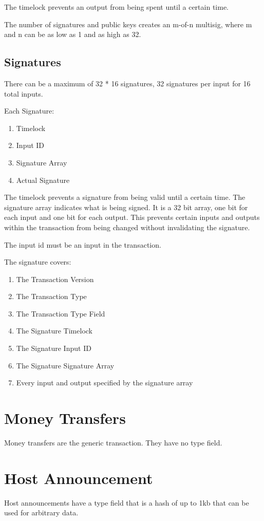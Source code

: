 \documentclass[twocolumn]{article}
\begin{document}
The timelock prevents an output from being spent until a certain time.

The number of signatures and public keys creates an m-of-n multisig, where m and n can be as low as 1 and as high as 32.

\subsection{Signatures}
There can be a maximum of 32 * 16 signatures, 32 signatures per input for 16 total inputs.

Each Signature:
\begin{enumerate}
	\item Timelock
	\item Input ID
	\item Signature Array
	\item Actual Signature
\end{enumerate}

The timelock prevents a signature from being valid until a certain time.
The signature array indicates what is being signed.
It is a 32 bit array, one bit for each input and one bit for each output.
This prevents certain inputs and outputs within the transaction from being changed without invalidating the signature.

The input id must be an input in the transaction.

The signature covers:
\begin{enumerate}
	\item The Transaction Version
	\item The Transaction Type
	\item The Transaction Type Field
	\item The Signature Timelock
	\item The Signature Input ID
	\item The Signature Signature Array
	\item Every input and output specified by the signature array
\end{enumerate}

\section{Money Transfers}
Money transfers are the generic transaction.
They have no type field.

\section{Host Announcement}
Host announcements have a type field that is a hash of up to 1kb that can be used for arbitrary data.
\end{document}
